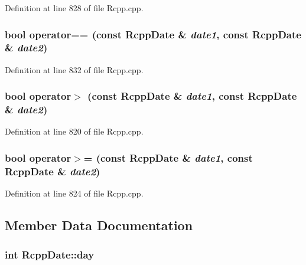 Definition at line 828 of file Rcpp.cpp.\hypertarget{classRcppDate_d6c1518c6eb9480665f532dbcc6dd2d5}{
\subsubsection[{operator==}]{\setlength{\rightskip}{0pt plus 5cm}bool operator== (const {\bf RcppDate} \& {\em date1}, \/  const {\bf RcppDate} \& {\em date2})}}
\label{classRcppDate_d6c1518c6eb9480665f532dbcc6dd2d5}




Definition at line 832 of file Rcpp.cpp.\hypertarget{classRcppDate_80164a177c098301c1d509fdab702567}{
\subsubsection[{operator$>$}]{\setlength{\rightskip}{0pt plus 5cm}bool operator$>$ (const {\bf RcppDate} \& {\em date1}, \/  const {\bf RcppDate} \& {\em date2})}}
\label{classRcppDate_80164a177c098301c1d509fdab702567}




Definition at line 820 of file Rcpp.cpp.\hypertarget{classRcppDate_f7a217e1f5d4a91e2d86fc4da858a6c2}{
\subsubsection[{operator$>$=}]{\setlength{\rightskip}{0pt plus 5cm}bool operator$>$= (const {\bf RcppDate} \& {\em date1}, \/  const {\bf RcppDate} \& {\em date2})}}
\label{classRcppDate_f7a217e1f5d4a91e2d86fc4da858a6c2}




Definition at line 824 of file Rcpp.cpp.

\subsection{Member Data Documentation}
\hypertarget{classRcppDate_9e6aec176d9432829a304550eadd4205}{
\subsubsection[{day}]{\setlength{\rightskip}{0pt plus 5cm}int {\bf RcppDate::day}}}
\label{classRcppDate_9e6aec176d9432829a304550eadd4205}




